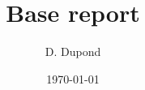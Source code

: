 \documentclass[12pt,french]{report}
\title{\Huge Base report}
\author{\LARGE D. Dupond}
\date{\Large \today}
\begin{document}
\maketitle
\large \tableofcontents

\normalsize




\end{document}
